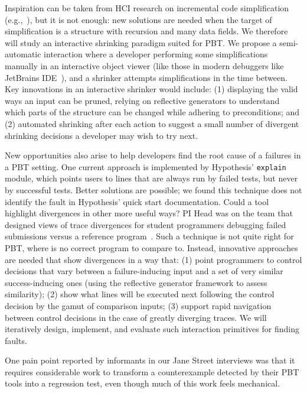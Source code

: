 Inspiration can be taken from HCI research on incremental code simplification
(e.g.,~\cite{ref:lim2018ply,ref:head2018interactive,ref:holmes2012systematizing,ref:hibschman2016telescope}), 
but it is not enough: new solutions are needed when the target of simplification 
is a structure with recursion and many data fields. We therefore will study an 
interactive shrinking paradigm suited for PBT. We propose a semi-automatic 
interaction where a developer performing some simplifications manually in an 
interactive
object viewer (like those in modern debuggers like JetBrains 
IDE~\cite{tool:jetbrains}), and a shrinker attempts
simplifications in the time between. Key innovations in an interactive shrinker 
would include: (1) displaying
the valid ways an input can be pruned,
relying on reflective generators to understand which parts of the
structure can be changed while adhering to preconditions; and (2) automated 
shrinking after each  action to suggest a small number of divergent shrinking 
decisions a developer may wish to try next.

New opportunities also arise to help developers find the root cause of a 
failures in a PBT setting. One current approach is implemented by Hypothesis' 
\texttt{explain} module, which points users to lines that are always run by 
failed tests, but never by successful tests. Better solutions are possible; we 
found this technique does not identify the fault in Hypothesis' quick start 
documentation. Could a tool highlight divergences in other more useful ways? PI 
Head was on the team that designed views of trace divergences for student 
programmers debugging failed submissions versus a reference 
program~\cite{ref:suzuki2017tracediff}.  Such a technique is not quite right for 
PBT, where is no correct program to compare to.  Instead, innovative approaches 
are needed that show divergences in a way that: (1) point programmers to control 
decisions that vary between a failure-inducing input and a set of very similar 
success-inducing ones (using the reflective generator framework to assess 
similarity); (2) show what lines will be executed next following the control 
decision by the gamut of comparison inputs; (3) support rapid navigation between 
control decisions in the case of greatly diverging traces. We will iteratively 
design, implement, and evaluate such interaction primitives for finding
faults.


%
One pain
point reported
by informants in our Jane Street interviews was that it requires
considerable work to
transform a counterexample detected by their PBT tools into a
regression test, even though much of this work
feels mechanical.

